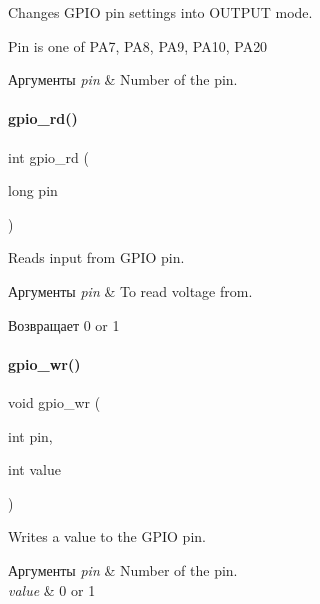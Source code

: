 Changes G\+P\+IO pin settings into O\+U\+T\+P\+UT mode. 

Pin is one of P\+A7, P\+A8, P\+A9, P\+A10, P\+A20


\begin{DoxyParams}{Аргументы}
{\em pin} & Number of the pin. \\
\hline
\end{DoxyParams}
\mbox{\label{rpp_8c_ad6984e49f7d3f20a75df42de600b0ece}} 
\paragraph{gpio\+\_\+rd()}
{\footnotesize\ttfamily int gpio\+\_\+rd (\begin{DoxyParamCaption}\item[{long}]{pin }\end{DoxyParamCaption})}



Reads input from G\+P\+IO pin. 


\begin{DoxyParams}{Аргументы}
{\em pin} & To read voltage from.\\
\hline
\end{DoxyParams}
\begin{DoxyReturn}{Возвращает}
0 or 1 
\end{DoxyReturn}
\mbox{\label{rpp_8c_ad9409dcfbc63a14f06db63ec39f0d494}} 
\paragraph{gpio\+\_\+wr()}
{\footnotesize\ttfamily void gpio\+\_\+wr (\begin{DoxyParamCaption}\item[{int}]{pin,  }\item[{int}]{value }\end{DoxyParamCaption})}



Writes a value to the G\+P\+IO pin. 


\begin{DoxyParams}{Аргументы}
{\em pin} & Number of the pin. \\
\hline
{\em value} & 0 or 1 \\
\hline
\end{DoxyParams}
\mbox{\label{rpp_8c_a0ddf1224851353fc92bfbff6f499fa97}} 
